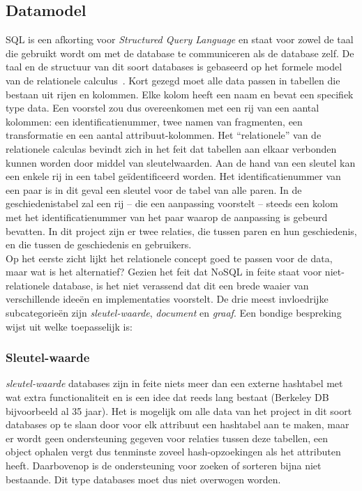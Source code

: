 \subsection{Datamodel}
SQL is een afkorting voor \emph{Structured Query Language} en staat voor zowel de taal die gebruikt wordt om met de database te communiceren als de database zelf. De taal en de structuur van dit soort databases is gebaseerd op het formele model van de relationele calculus~\cite{Codd90}. Kort gezegd moet alle data passen in tabellen die bestaan uit rijen en kolommen. Elke kolom heeft een naam en bevat een specifiek type data. Een voorstel zou dus overeenkomen met een rij van een aantal kolommen: een identificatienummer, twee namen van fragmenten, een transformatie en een aantal attribuut-kolommen. Het ``relationele'' van de relationele calculas bevindt zich in het feit dat tabellen aan elkaar verbonden kunnen worden door middel van sleutelwaarden. Aan de hand van een sleutel kan een enkele rij in een tabel ge\"identificeerd worden. Het identificatienummer van een paar is in dit geval een sleutel voor de tabel van alle paren. In de geschiedenistabel zal een rij -- die een aanpassing voorstelt -- steeds een kolom met het identificatienummer van het paar waarop de aanpassing is gebeurd bevatten. In dit project zijn er twee relaties, die tussen paren en hun geschiedenis, en die tussen de geschiedenis en gebruikers.\\ 

Op het eerste zicht lijkt het relationele concept goed te passen voor de data, maar wat is het alternatief? Gezien het feit dat NoSQL in feite staat voor niet-relationele database, is het niet verassend dat dit een brede waaier van verschillende idee\"en en implementaties voorstelt. De drie meest invloedrijke subcategorie\"en zijn \emph{sleutel-waarde}, \emph{document} en \emph{graaf}. Een bondige bespreking wijst uit welke toepasselijk is:

\subsubsection{Sleutel-waarde}
\emph{sleutel-waarde} databases zijn in feite niets meer dan een externe hashtabel met wat extra functionaliteit en is een idee dat reeds lang bestaat (Berkeley DB bijvoorbeeld al 35 jaar). Het is mogelijk om alle data van het project in dit soort databases op te slaan door voor elk attribuut een hashtabel aan te maken, maar er wordt geen ondersteuning gegeven voor relaties tussen deze tabellen, een object ophalen vergt dus tenminste zoveel hash-opzoekingen als het attributen heeft. Daarbovenop is de ondersteuning voor zoeken of sorteren bijna niet bestaande. Dit type databases moet dus niet overwogen worden.

